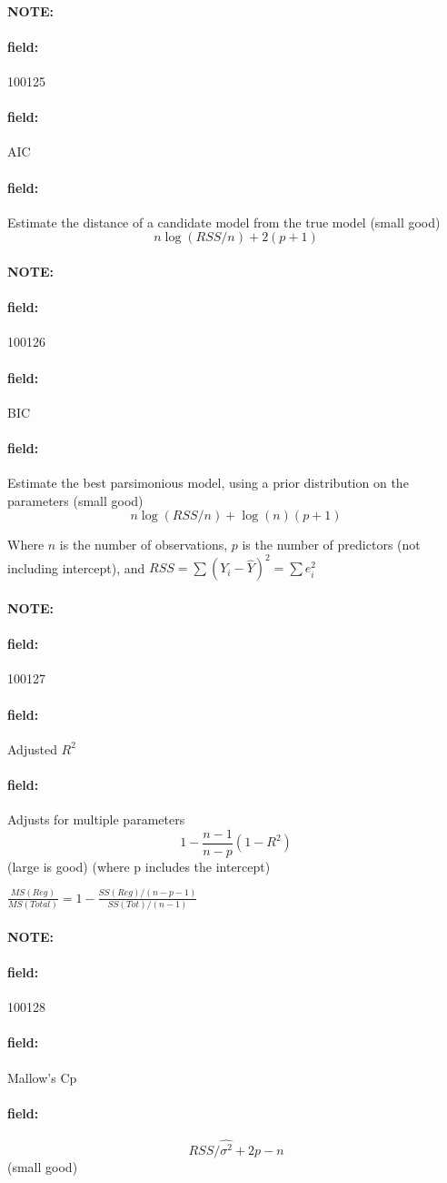 \documentclass[12pt]{article}
\newenvironment{note}{\paragraph{NOTE:}}{}
\newenvironment{field}{\paragraph{field:}}{}
\begin{document}
\begin{note} \begin{field} \tiny 100125 \end{field}
 \begin{field}
  AIC
 \end{field}
 \begin{field}
  Estimate the distance of a candidate model from the true model (small good)
  $$ n \log (RSS/n) + 2(p+1)$$
 \end{field}
\end{note}


\begin{note} \begin{field} \tiny 100126 \end{field}
 \begin{field}
  BIC
 \end{field}
 \begin{field}
  Estimate the best parsimonious model, using a prior distribution on the parameters (small good)
  $$  n \log (RSS/n) + \log(n)(p+1)$$

  Where $n$ is the number of observations, $p$ is the number of predictors (not including intercept), and $RSS = \sum (Y_i - \hat{Y})^2 = \sum e_i^2 $
 \end{field}
\end{note}


\begin{note} \begin{field} \tiny 100127 \end{field}
 \begin{field}
  Adjusted $R^2$
 \end{field}
 \begin{field}
  Adjusts for multiple parameters
  $$ 1 - \frac{n-1}{n-p}(1 - R^2)$$ (large is good)
  (where p includes the intercept)

  $\frac{MS(Reg)}{MS(Total)} = 1 - \frac{SS(Reg)/(n - p - 1)}{SS(Tot)/(n-1)}$
 \end{field}
\end{note}

\begin{note} \begin{field} \tiny 100128 \end{field}
 \begin{field}
  Mallow's Cp
 \end{field}
 \begin{field}
  $$ RSS/\hat{\sigma^2} + 2p - n $$ (small good)
 \end{field}
\end{note}
\end{document}
